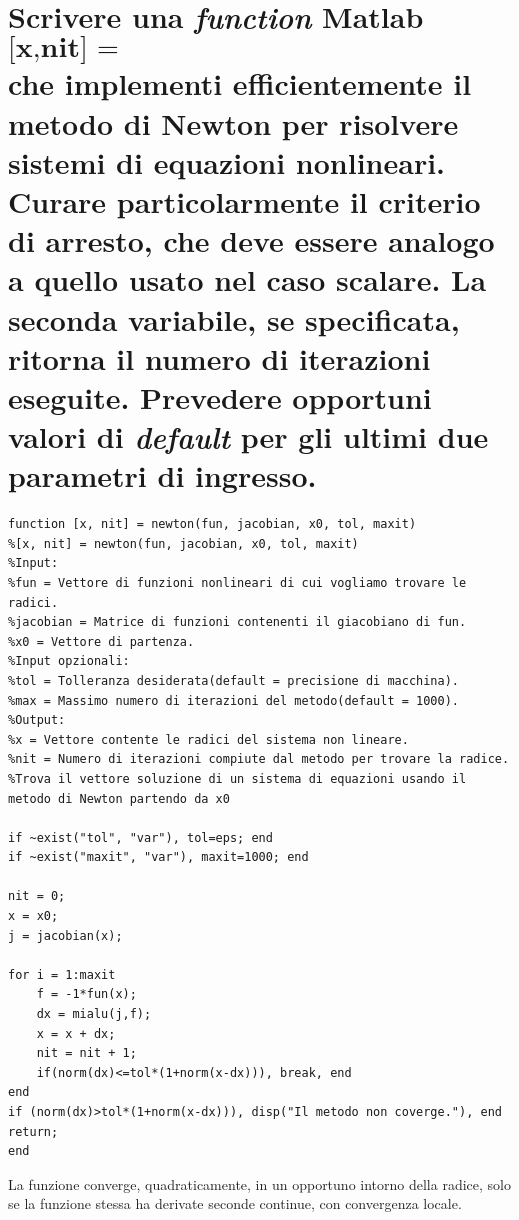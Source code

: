 \documentclass[10pt,a4paper]{article}
\begin{document}
\section{Scrivere una \textit{function} Matlab
  $$ \textbf{[x,nit] = newton(fun,jacobian,x0,tol,maxit)} $$
  che implementi efficientemente il metodo di Newton per risolvere sistemi di
  equazioni nonlineari. Curare particolarmente il criterio di arresto, che deve essere
  analogo a quello usato nel caso scalare.
  La seconda variabile, se specificata, ritorna il numero di iterazioni eseguite.
  Prevedere opportuni valori di \textit{default} per gli ultimi due parametri
  di ingresso.}
\begin{lstlisting}[style=Matlab-editor]
function [x, nit] = newton(fun, jacobian, x0, tol, maxit)
%[x, nit] = newton(fun, jacobian, x0, tol, maxit)
%Input: 
%fun = Vettore di funzioni nonlineari di cui vogliamo trovare le radici.
%jacobian = Matrice di funzioni contenenti il giacobiano di fun. 
%x0 = Vettore di partenza.
%Input opzionali:
%tol = Tolleranza desiderata(default = precisione di macchina).
%max = Massimo numero di iterazioni del metodo(default = 1000).
%Output:
%x = Vettore contente le radici del sistema non lineare.
%nit = Numero di iterazioni compiute dal metodo per trovare la radice.
%Trova il vettore soluzione di un sistema di equazioni usando il metodo di Newton partendo da x0
  
if ~exist("tol", "var"), tol=eps; end 
if ~exist("maxit", "var"), maxit=1000; end
  
nit = 0;
x = x0;
j = jacobian(x);

for i = 1:maxit
    f = -1*fun(x);
    dx = mialu(j,f);
    x = x + dx;
    nit = nit + 1;
    if(norm(dx)<=tol*(1+norm(x-dx))), break, end
end
if (norm(dx)>tol*(1+norm(x-dx))), disp("Il metodo non coverge."), end
return;
end
\end{lstlisting}

La funzione converge, quadraticamente, in un opportuno intorno della radice, solo se la funzione stessa ha derivate seconde continue,
con convergenza locale.
\end{document}
